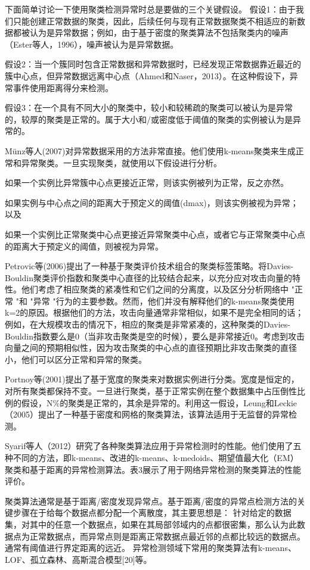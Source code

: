 下面简单讨论一下使用聚类检测异常时总是要做的三个关键假设。
假设1：由于我们只能创建正常数据的聚类，因此，后续任何与现有正常数据聚类不相适应的新数据都被认为是异常数据；例如，由于基于密度的聚类算法不包括聚类内的噪声（Ester等人，1996），噪声被认为是异常数据。

假设2：当一个簇同时包含正常数据和异常数据时，已经发现正常数据靠近最近的簇中心点，但异常数据远离中心点（Ahmed和Naser，2013）。在这种假设下，异常事件使用距离得分来检测。

假设3：在一个具有不同大小的聚类中，较小和较稀疏的聚类可以被认为是异常的，较厚的聚类是正常的。属于大小和/或密度低于阈值的聚类的实例被认为是异常的。


Münz等人(2007)对异常数据采用的方法非常直接。他们使用k-means聚类来生成正常和异常聚类。一旦实现聚类，就使用以下假设进行分析。

如果一个实例比异常簇中心点更接近正常，则该实例被列为正常，反之亦然。


如果实例与中心点之间的距离大于预定义的阈值(dmax)，则该实例被视为异常；以及


如果一个实例比正常聚类中心点更接近异常聚类中心点，或者它与正常聚类中心点的距离大于预定义的阈值，则被视为异常。


Petrovic等(2006)提出了一种基于聚类评价技术组合的聚类标签策略。将Davies-Bouldin聚类评价指数和聚类中心直径的比较结合起来，以充分应对攻击向量的特性。他们考虑了相应聚类的紧凑性和它们之间的分离度，以及区分分析网络中 "正常 "和 "异常 "行为的主要参数。然而，他们并没有解释他们的k-means聚类使用k=2的原因。根据他们的方法，攻击向量通常非常相似，如果不是完全相同的话；例如，在大规模攻击的情况下，相应的聚类是非常紧凑的，这种聚类的Davies-Bouldin指数要么是0（当非攻击聚类是空的时候），要么是非常接近0。考虑到攻击向量之间的预期相似性，因为攻击聚类的中心点的直径预期比非攻击聚类的直径小，他们可以区分正常和异常的聚类。

Portnoy等(2001)提出了基于宽度的聚类来对数据实例进行分类。宽度是恒定的，对所有聚类都保持不变。一旦进行聚类，基于正常实例在整个数据集中占压倒性比例的假设，N\%的聚类是正常的，其余是异常的。利用这一假设，Leung和Leckie（2005）提出了一种基于密度和网格的聚类算法，该算法适用于无监督的异常检测。

Syarif等人（2012）研究了各种聚类算法应用于异常检测时的性能。他们使用了五种不同的方法，即k-means、改进的k-means、k-medoids、期望值最大化（EM）聚类和基于距离的异常检测算法。表3展示了用于网络异常检测的聚类算法的性能评价。



聚类算法通常是基于距离/密度发现异常点。基于距离/密度的异常点检测方法的关键步骤在于给每个数据点都分配一个离散度，其主要思想是：
针对给定的数据集，对其中的任意一个数据点，如果在其局部邻域内的点都很密集，那么认为此数据点为正常数据点，而异常点则是距离正常数据点最近邻的点都比较远的数据点。通常有阈值进行界定距离的远近。
异常检测领域下常用的聚类算法有k-means、LOF、孤立森林、高斯混合模型[20]等。


